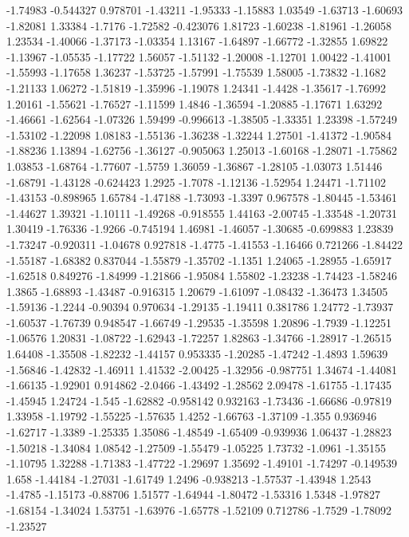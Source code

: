 \documentclass[9pt]{article}
\theoremstyle{plain}
\theoremstyle{definition}
\theoremstyle{remark}
\numberwithin{equation}{section}
\begin{document}
-1.74983
-0.544327
0.978701
-1.43211
-1.95333
-1.15883
1.03549
-1.63713
-1.60693
-1.82081
1.33384
-1.7176
-1.72582
-0.423076
1.81723
-1.60238
-1.81961
-1.26058
1.23534
-1.40066
-1.37173
-1.03354
1.13167
-1.64897
-1.66772
-1.32855
1.69822
-1.13967
-1.05535
-1.17722
1.56057
-1.51132
-1.20008
-1.12701
1.00422
-1.41001
-1.55993
-1.17658
1.36237
-1.53725
-1.57991
-1.75539
1.58005
-1.73832
-1.1682
-1.21133
1.06272
-1.51819
-1.35996
-1.19078
1.24341
-1.4428
-1.35617
-1.76992
1.20161
-1.55621
-1.76527
-1.11599
1.4846
-1.36594
-1.20885
-1.17671
1.63292
-1.46661
-1.62564
-1.07326
1.59499
-0.996613
-1.38505
-1.33351
1.23398
-1.57249
-1.53102
-1.22098
1.08183
-1.55136
-1.36238
-1.32244
1.27501
-1.41372
-1.90584
-1.88236
1.13894
-1.62756
-1.36127
-0.905063
1.25013
-1.60168
-1.28071
-1.75862
1.03853
-1.68764
-1.77607
-1.5759
1.36059
-1.36867
-1.28105
-1.03073
1.51446
-1.68791
-1.43128
-0.624423
1.2925
-1.7078
-1.12136
-1.52954
1.24471
-1.71102
-1.43153
-0.898965
1.65784
-1.47188
-1.73093
-1.3397
0.967578
-1.80445
-1.53461
-1.44627
1.39321
-1.10111
-1.49268
-0.918555
1.44163
-2.00745
-1.33548
-1.20731
1.30419
-1.76336
-1.9266
-0.745194
1.46981
-1.46057
-1.30685
-0.699883
1.23839
-1.73247
-0.920311
-1.04678
0.927818
-1.4775
-1.41553
-1.16466
0.721266
-1.84422
-1.55187
-1.68382
0.837044
-1.55879
-1.35702
-1.1351
1.24065
-1.28955
-1.65917
-1.62518
0.849276
-1.84999
-1.21866
-1.95084
1.55802
-1.23238
-1.74423
-1.58246
1.3865
-1.68893
-1.43487
-0.916315
1.20679
-1.61097
-1.08432
-1.36473
1.34505
-1.59136
-1.2244
-0.90394
0.970634
-1.29135
-1.19411
0.381786
1.24772
-1.73937
-1.60537
-1.76739
0.948547
-1.66749
-1.29535
-1.35598
1.20896
-1.7939
-1.12251
-1.06576
1.20831
-1.08722
-1.62943
-1.72257
1.82863
-1.34766
-1.28917
-1.26515
1.64408
-1.35508
-1.82232
-1.44157
0.953335
-1.20285
-1.47242
-1.4893
1.59639
-1.56846
-1.42832
-1.46911
1.41532
-2.00425
-1.32956
-0.987751
1.34674
-1.44081
-1.66135
-1.92901
0.914862
-2.0466
-1.43492
-1.28562
2.09478
-1.61755
-1.17435
-1.45945
1.24724
-1.545
-1.62882
-0.958142
0.932163
-1.73436
-1.66686
-0.97819
1.33958
-1.19792
-1.55225
-1.57635
1.4252
-1.66763
-1.37109
-1.355
0.936946
-1.62717
-1.3389
-1.25335
1.35086
-1.48549
-1.65409
-0.939936
1.06437
-1.28823
-1.50218
-1.34084
1.08542
-1.27509
-1.55479
-1.05225
1.73732
-1.0961
-1.35155
-1.10795
1.32288
-1.71383
-1.47722
-1.29697
1.35692
-1.49101
-1.74297
-0.149539
1.658
-1.44184
-1.27031
-1.61749
1.2496
-0.938213
-1.57537
-1.43948
1.2543
-1.4785
-1.15173
-0.88706
1.51577
-1.64944
-1.80472
-1.53316
1.5348
-1.97827
-1.68154
-1.34024
1.53751
-1.63976
-1.65778
-1.52109
0.712786
-1.7529
-1.78092
-1.23527
\end{document}
